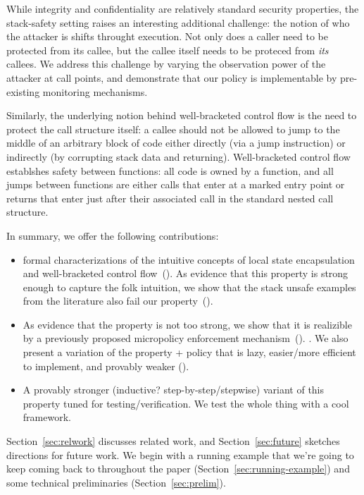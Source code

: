 \documentclass[acmsmall,review,anonymous]{acmart}\settopmatter{printfolios=true,printccs=false,printacmref=false}
\begin{document}
While integrity and confidentiality are relatively standard security
properties, the stack-safety setting raises an interesting additional
challenge:
the notion of who the attacker is shifts throught execution. Not only
does a caller need to be protected from its callee, but the callee
itself needs to be proteced from {\em its} callees.
We address this challenge by varying the observation power
of the attacker at call points, and demonstrate that our policy is
implementable by pre-existing monitoring mechanisms. 

Similarly, the underlying notion behind well-bracketed control flow is
the need to protect the call structure itself: a callee should not be
allowed to jump to the middle of an arbitrary block of code either
directly (via a jump instruction) or indirectly (by corrupting stack
data and returning). Well-bracketed control flow establshes safety between
functions: all code is owned by a function, and all jumps between functions
are either calls that enter at a marked entry point or returns that enter
just after their associated call in the standard nested call structure.


In summary, we offer the following contributions:
\begin{itemize}
\item {} formal characterizations of the
  intuitive concepts of local state encapsulation and
  well-bracketed control flow~().  As evidence that this
  property is strong enough to capture the folk intuition, we show
  that the stack unsafe examples from the literature also fail our
  property~().
\item As evidence that the property is not too strong, we show that it is
  realizible by
  a previously proposed micropolicy enforcement
  mechanism~(). . We also present a variation of the
  property + policy that is lazy, easier/more efficient to implement,
  and provably weaker ().
\item A provably stronger (inductive? step-by-step/stepwise) variant
  of this property tuned for testing/verification.  We test the whole
  thing with a cool framework. 
\end{itemize}
Section~\ref{sec:relwork} discusses related work, and
Section~\ref{sec:future} sketches directions for future work.
%
We begin with a running example that we're going to keep coming back
to throughout the paper (Section~\ref{sec:running-example}) and some
technical preliminaries (Section~\ref{sec:prelim}).
\end{document}
